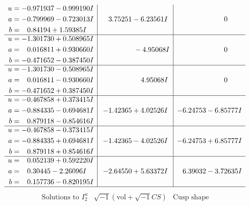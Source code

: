 \documentclass[1p]{elsarticle_modified}
\theoremstyle{definition}
\newcommand{\I}{\sqrt{-1}}
\begin{document}
$$\begin{array}{c|c|c}
\begin{aligned}
u &= -0.971937 - 0.999190 I \\
a &= -0.799969 - 0.723013 I \\
b &= \phantom{-}0.84194 + 1.59385 I\end{aligned}
 & \phantom{-}3.75251 - 6.23561 I & \phantom{-0.000000 } 0 \\ \hline\begin{aligned}
u &= -1.301730 + 0.508965 I \\
a &= \phantom{-}0.016811 + 0.930660 I \\
b &= -0.471652 - 0.387450 I\end{aligned}
 & \phantom{-0.000000 } -4.95068 I & \phantom{-0.000000 } 0 \\ \hline\begin{aligned}
u &= -1.301730 - 0.508965 I \\
a &= \phantom{-}0.016811 - 0.930660 I \\
b &= -0.471652 + 0.387450 I\end{aligned}
 & \phantom{-0.000000 -}4.95068 I & \phantom{-0.000000 } 0 \\ \hline\begin{aligned}
u &= -0.467858 + 0.373415 I \\
a &= -0.884335 - 0.694681 I \\
b &= \phantom{-}0.879118 - 0.854616 I\end{aligned}
 & -1.42365 + 4.02526 I & -6.24753 - 6.85777 I \\ \hline\begin{aligned}
u &= -0.467858 - 0.373415 I \\
a &= -0.884335 + 0.694681 I \\
b &= \phantom{-}0.879118 + 0.854616 I\end{aligned}
 & -1.42365 - 4.02526 I & -6.24753 + 6.85777 I \\ \hline\begin{aligned}
u &= \phantom{-}0.052139 + 0.592220 I \\
a &= \phantom{-}0.30445 - 2.26096 I \\
b &= \phantom{-}0.157736 - 0.820195 I\end{aligned}
 & -2.64550 + 5.63372 I & \phantom{-}6.39032 - 3.72635 I\\
 \hline 
 \end{array}$$\newpage$$\begin{array}{c|c|c}  
\text{Solutions to }I^u_{2}& \I (\text{vol} + \sqrt{-1}CS) & \text{Cusp shape}\\
 \hline 
\begin{aligned}

\end{aligned}
\end{array}$$
\end{document}
